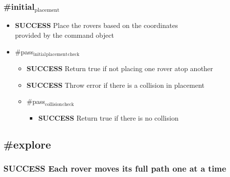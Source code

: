 \documentclass{article}
\begin{document}
\subsubsection{\#initial$_{\mathrm{placement}}$}
\label{sec-9-1-4}
\begin{itemize}

\item \textbf{SUCCESS} Place the rovers based on the coordinates\\
\label{sec-9-1-4-1}%
provided by the command object

\item \#pass$_{\mathrm{initial}}$$_{\mathrm{placement}}$$_{\mathrm{check}}$
\label{sec-9-1-4-2}%
\begin{itemize}

\item \textbf{SUCCESS} Return true if not placing one rover atop another\\
\label{sec-9-1-4-2-1}%
\item \textbf{SUCCESS} Throw error if there is a collision in placement\\
\label{sec-9-1-4-2-2}%
\item \#pass$_{\mathrm{collision}}$$_{\mathrm{check}}$
\label{sec-9-1-4-2-3}%
\begin{itemize}

\item \textbf{SUCCESS} Return true if there is no collision\\
\label{sec-9-1-4-2-3-1}%
\end{itemize} %
\end{itemize} %
\end{itemize} %
\subsection{\#explore}
\label{sec-9-2}
\subsubsection{\textbf{SUCCESS} Each rover moves its full path one at a time}
\label{sec-9-2-1}
\end{document}
